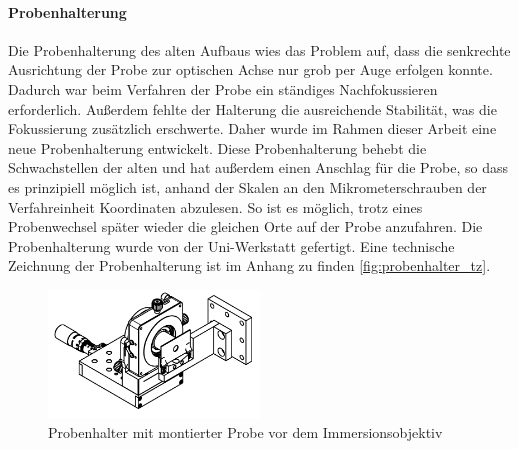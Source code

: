 \documentclass[titlepage]{article}
\begin{document}
	\paragraph{Probenhalterung}
	Die Probenhalterung des alten Aufbaus wies das Problem auf, dass die senkrechte Ausrichtung der Probe zur optischen Achse nur grob per Auge erfolgen konnte. Dadurch war beim Verfahren der Probe ein ständiges Nachfokussieren erforderlich. Außerdem fehlte der Halterung die ausreichende Stabilität, was die Fokussierung zusätzlich erschwerte. Daher wurde im Rahmen dieser Arbeit eine neue Probenhalterung entwickelt. Diese Probenhalterung behebt die Schwachstellen der alten und hat außerdem einen Anschlag für die Probe, so dass es prinzipiell möglich ist, anhand der Skalen an den Mikrometerschrauben der Verfahreinheit Koordinaten abzulesen. So ist es möglich, trotz eines Probenwechsel später wieder die gleichen Orte auf der Probe anzufahren. Die Probenhalterung wurde von der Uni-Werkstatt gefertigt. Eine technische Zeichnung der Probenhalterung ist im Anhang zu finden \ref{fig:probenhalter_tz}.
	\begin{figure}[htbp] 
		\centering
		\includegraphics[width=0.5\textwidth]{figures/Probenhalter.pdf}
		\caption[Probenhalterung]{Probenhalter mit montierter Probe vor dem Immersionsobjektiv}
		\label{fig:probenhalter}
	\end{figure}
\end{document}
